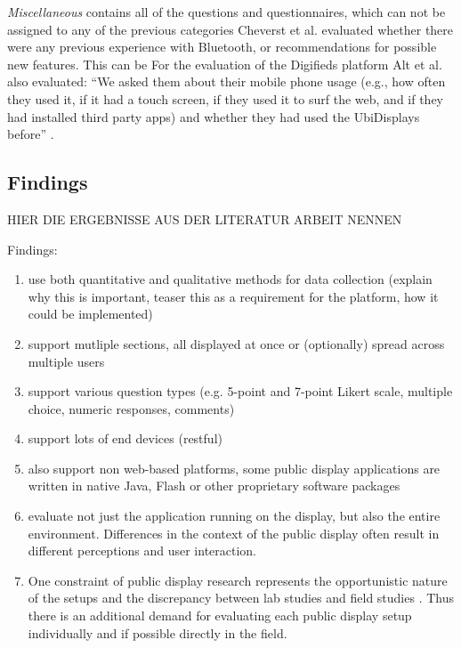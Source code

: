 		\textit{Miscellaneous} contains all of the questions and questionnaires, which can not be assigned to any of the previous categories 
		Cheverst et al. \cite{cheverst2005hermes} evaluated whether there were any previous experience with Bluetooth, or recommendations for possible new features. This can be 
		For the evaluation of the Digifieds platform Alt et al. also evaluated: ``We asked them about their mobile phone usage (e.g., how often they used it, if it had a touch screen, if they used it to surf the web, and if they had installed third party apps) and whether they had used the UbiDisplays before'' \cite{alt2011digifieds}.









\subsection{Findings}
\label{section:questionnaires:findings}

	HIER DIE ERGEBNISSE AUS DER LITERATUR ARBEIT NENNEN




	Findings: 
	\begin{enumerate}
	\item use both quantitative and qualitative methods for data collection (explain why this is important, teaser this as a requirement for the platform, how it could be implemented)

	\item support mutliple sections, all displayed at once or (optionally) spread across multiple users

	\item support various question types (e.g. 5-point and 7-point Likert scale, multiple choice, numeric responses, comments)

	\item support lots of end devices (restful)

	\item also support non web-based platforms, some public display applications are written in native Java, Flash or other proprietary software packages

	\item evaluate not just the application running on the display, but also the entire environment. Differences in the context of the public display often result in different perceptions and user interaction.

	\item 	One constraint of public display research represents the opportunistic nature of the setups and the discrepancy between lab studies and field studies \cite{Ojala2011}. Thus there is an additional demand for evaluating each public display setup individually and if possible directly in the field.

	\end{enumerate}



